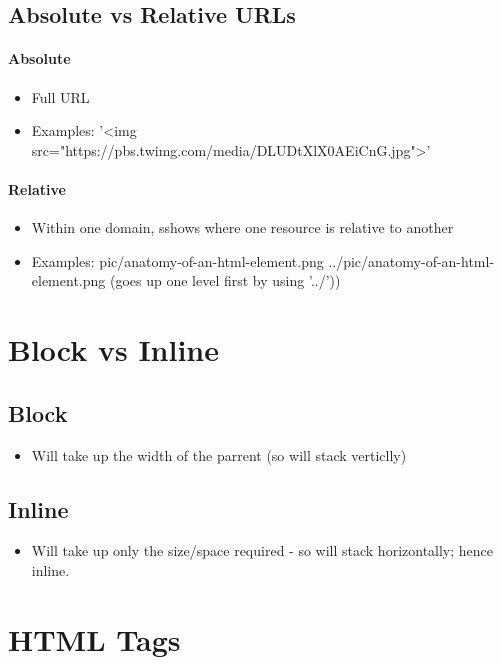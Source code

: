 \documentclass[]{article}
\newcommand{\<}{\guilsinglleft}
\renewcommand{\>}{\guilsinglright}
\begin{document}
\subsection{Absolute vs Relative URLs}
\paragraph{Absolute}

	\begin{itemize}
		\item Full URL
		\item Examples:
		\subitem '<img src="https://pbs.twimg.com/media/DLUDtXlX0AEiCnG.jpg">'
	\end{itemize}

\paragraph{Relative}

	\begin{itemize}
		\item Within one domain, sshows where one resource is relative to another
		\item Examples:
		\subitem pic/anatomy-of-an-html-element.png
		\subitem ../pic/anatomy-of-an-html-element.png (goes up one level first by using '../'))
	\end{itemize}

\section{Block vs Inline}
\subsection{Block}
\begin{itemize}
	\item Will take up the width of the parrent (so will stack verticlly)
\end{itemize}
\subsection{Inline} 
\begin{itemize}
	\item Will take up only the size/space required - so will stack horizontally; hence inline.
\end{itemize}

\section{HTML Tags}
\end{document}
